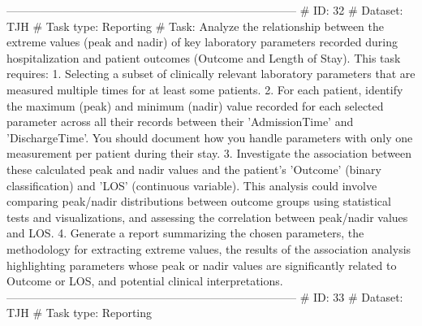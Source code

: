 \begin{tcolorbox}[colback=cadmiumgreen!5!white,colframe=forestgreen!75!white,breakable,title=\textit{Generated analytical tasks in task 4.}]
\begin{VerbatimWrap}
-----------------------------------------------------------------------------
# ID: 32  
# Dataset: TJH 
# Task type: Reporting
# Task: Analyze the relationship between the extreme values (peak and nadir) of key laboratory parameters recorded during hospitalization and patient outcomes (Outcome and Length of Stay). This task requires: 1. Selecting a subset of clinically relevant laboratory parameters that are measured multiple times for at least some patients. 2. For each patient, identify the maximum (peak) and minimum (nadir) value recorded for each selected parameter across all their records between their 'AdmissionTime' and 'DischargeTime'. You should document how you handle parameters with only one measurement per patient during their stay. 3. Investigate the association between these calculated peak and nadir values and the patient's 'Outcome' (binary classification) and 'LOS' (continuous variable). This analysis could involve comparing peak/nadir distributions between outcome groups using statistical tests and visualizations, and assessing the correlation between peak/nadir values and LOS. 4. Generate a report summarizing the chosen parameters, the methodology for extracting extreme values, the results of the association analysis highlighting parameters whose peak or nadir values are significantly related to Outcome or LOS, and potential clinical interpretations.
-----------------------------------------------------------------------------
# ID: 33  
# Dataset: TJH 
# Task type: Reporting

\end{VerbatimWrap}
\end{tcolorbox}
